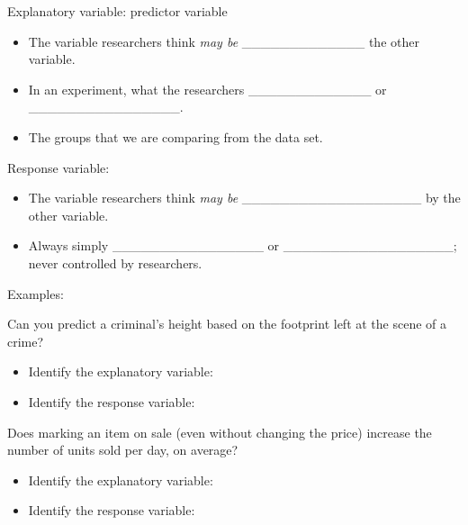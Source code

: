 \documentclass[
]{report}
\providecommand{\tightlist}{%
  \setlength{\itemsep}{0pt}\setlength{\parskip}{0pt}}
\begin{document}
Explanatory variable: predictor variable

\begin{itemize}
\item
  The variable researchers think \emph{may be} \_\_\_\_\_\_\_\_\_\_\_\_\_
  the other variable.
\item
  In an experiment, what the researchers \_\_\_\_\_\_\_\_\_\_\_\_\_ or \_\_\_\_\_\_\_\_\_\_\_\_\_\_\_\_.
\item
  The groups that we are comparing from the data set.
\end{itemize}

Response variable:

\begin{itemize}
\item
  The variable researchers think \emph{may be} \_\_\_\_\_\_\_\_\_\_\_\_\_\_\_\_\_\_\_ by the other variable.
\item
  Always simply \_\_\_\_\_\_\_\_\_\_\_\_\_\_\_\_ or \_\_\_\_\_\_\_\_\_\_\_\_\_\_\_\_\_\_; never controlled by researchers.
\end{itemize}

Examples:

Can you predict a criminal's height based on the footprint left at the scene of a crime?

\begin{itemize}
\tightlist
\item
  Identify the explanatory variable:
\end{itemize}

\vspace{0.3in}

\begin{itemize}
\tightlist
\item
  Identify the response variable:
\end{itemize}

\vspace{0.3in}

Does marking an item on sale (even without changing the price) increase the number of units sold per day, on average?

\begin{itemize}
\tightlist
\item
  Identify the explanatory variable:
\end{itemize}

\vspace{0.3in}

\begin{itemize}
\tightlist
\item
  Identify the response variable:
\end{itemize}
\end{document}
